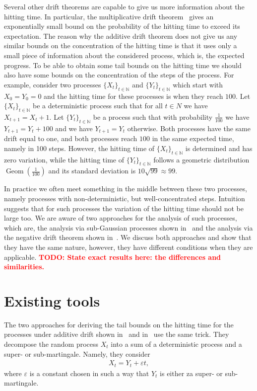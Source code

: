 \documentclass[12pt, a4paper]{article}
\theoremstyle{remark}
\theoremstyle{definition}
\newcommand{\N}{{\mathbb N}}
\newcommand{\eps}{\varepsilon}
\newcommand{\todo}[1]{\textbf{\textcolor{red}{TODO: #1}}}
\DeclareMathOperator{\Geom}{Geom}
\begin{document}
Several other drift theorems are capable to give us more information about the hitting time. In particular, the multiplicative drift theorem~\cite{DoerrJW12} gives an exponentially small bound on the probability of the hitting time to exceed its expectation. The reason why the additive drift theorem does not give us any similar bounds on the concentration of the hitting time is that it uses only a small piece of information about the considered process, which is, the expected progress. To be able to obtain some tail bounds on the hitting time we should also have some bounds on the concentration of the steps of the process. For example, consider two processes $\{X_t\}_{t \in \N}$ and $\{Y_t\}_{t \in \N}$ which start with $X_0 = Y_0 = 0$ and the hitting time for these processes is when they reach $100$. Let $\{X_t\}_{t \in \N}$ be a deterministic process such that for all $t \in N$ we have $X_{t + 1} = X_t + 1$. Let $\{Y_t\}_{t \in \N}$ be a process such that with probability $\frac{1}{100}$ we have $Y_{t + 1} = Y_t + 100$ and we have $Y_{t + 1} = Y_t$ otherwise. Both processes have the same drift equal to one, and both processes reach $100$ in the same expected time, namely in 100 steps. However, the hitting time of $\{X_t\}_{t \in \N}$ is determined and has zero variation, while the hitting time of $\{Y_t\}_{t \in \N}$ follows a geometric distribution $\Geom(\frac{1}{100})$ and its standard deviation is $10\sqrt{99} \approx 99$.

In practice we often meet something in the middle between these two processes, namely processes with non-deterministic, but well-concentrated steps. Intuition suggests that for such processes the variation of the hitting time should not be large too. We are aware of two approaches for the analysis of such processes, which are, the analysis via sub-Gaussian processes shown in~\cite{Kotzing16} and the analysis via the negative drift theorem shown in~\cite{AntipovDK19}. We discuss both approaches and show that they have the same nature, however, they have different conditions when they are applicable. \todo{State exact results here: the differences and similarities.}

\section{Existing tools}

The two approaches for deriving the tail bounds on the hitting time for the processes under additive drift shown in~\cite{Kotzing16} and in~\cite{AntipovDK19} use the same trick. They decompose the random process $X_t$ into a sum of a deterministic process and a super- or sub-martingale. Namely, they consider
\begin{align*}
    X_t = Y_t + \eps t,
\end{align*}
where $\eps$ is a constant chosen in such a way that $Y_t$ is either za super- or sub-martingale.
\end{document}
